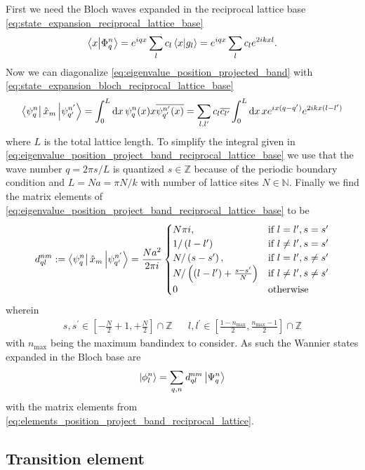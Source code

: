 First we need the Bloch waves expanded in the reciprocal lattice base
\cref{eq:state_expansion_reciprocal_lattice_base}
\begin{equation}
  \bra{x}\ket{\Phi^n_q}
  =e^{iqx}\sum_lc_l\bra{x}\ket{g_l}
  =e^{iqx}\sum_lc_le^{2ikxl}
  \label{eq:state_expansion_bloch_reciprocal_lattice_base}.
\end{equation}
Now we can diagonalize \cref{eq:eigenvalue_position_projected_band} with
\cref{eq:state_expansion_bloch_reciprocal_lattice_base}
\begin{equation}
  \bra{\psi^n_{q}}\hat{x}_m\ket{\psi^{n^\prime}_{q^\prime}}
  =\int_0^L\dd{x}\psi^n_{q}(x)x\overline{\psi^{n^\prime}_{q^\prime}(x)}
  =\sum_{l,l^\prime}c_l\overline{c_{l^\prime}}\int_0^L\dd{x}xe^{ix(q-q^\prime)}e^{2ikx(l-l^\prime)}
  \label{eq:eigenvalue_position_project_band_reciprocal_lattice_base}
\end{equation}
where $L$ is the total lattice length. To simplify the integral given in
\cref{eq:eigenvalue_position_project_band_reciprocal_lattice_base} we use
that the wave number $q=2\pi s/L$ is quantized $s\in\mathbb{Z}$ because of
the periodic boundary condition and $L=Na=\pi N/k$ with number of lattice
sites $N\in\mathbb{N}$. Finally we find the matrix elements of
\cref{eq:eigenvalue_position_project_band_reciprocal_lattice_base} to be
\begin{equation}
  d^{nm}_{ql}
  :=
  \bra{\psi^n_{q}}\hat{x}_m\ket{\psi^{n^\prime}_{q^\prime}}
  =
  \frac{Na^2}{2\pi i}
  \begin{cases}
    N\pi i,
    & \text{if } l=l^\prime,s=s^\prime\\
    1/\left(l-l^\prime\right)
    & \text{if } l\neq l^\prime,s=s^\prime\\
    N/\left(s-s^\prime\right),
    & \text{if } l=l^\prime,s\neq s^\prime\\
    N/\left((l-l^\prime)+\frac{s-s^\prime}{N}\right)
    & \text{if } l\neq l^\prime,s\neq s^\prime\\
    0 & \text{otherwise}
  \end{cases}
  \label{eq:elements_position_project_band_reciprocal_lattice}
\end{equation}
wherein
\begin{align}
  s,s^\prime\in\left[-\frac{N}{2}+1,+\frac{N}{2}\right]\cap\mathbb{Z}
  &&
  l,l^\prime\in\left[\frac{1-n_\text{max}}{2},\frac{n_\text{max}-1}{2}\right]
  \cap\mathbb{Z}
\end{align}
with $n_\text{max}$ being the maximum bandindex to consider. As such the
Wannier states expanded in the Bloch base are
\begin{equation}
  \ket{\phi^n_l}
  =\sum_{q,n}d^{nm}_{ql}\ket{\Psi^n_q}
  \label{eq:state_expansion_wannier_in_bloch_base}
\end{equation}
with the matrix elements from
\cref{eq:elements_position_project_band_reciprocal_lattice}.

\subsection{Transition element}

